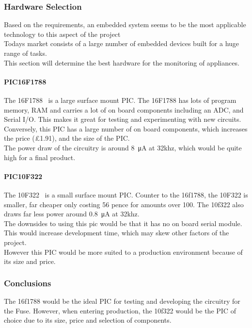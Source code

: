 \documentclass[draft,preprint,12pt,3p]{elsarticle}
\begin{document}
\subsubsection{Hardware Selection}
Based on the requirements, an embedded system seems to be the most applicable technology to this aspect of the project\\
Todays market consists of a large number of embedded devices built for a huge range of tasks.\\
This section will determine the best hardware for the monitoring of appliances.
\paragraph{PIC16F1788}
The 16F1788~\cite{16f1788} is a large surface mount PIC. The 16F1788 has lots of program memory, RAM  and carries a lot of on board components including an ADC, and Serial I/O. This makes it great for testing and experimenting with new circuits.\\
Conversely, this PIC has a large number of on board components, which increases the price (\pounds1.91),  and the size of the PIC.\\
The power draw of the circuitry is around \SI{8}{\micro\ampere} at 32khz, which would be quite high for a final product.



\paragraph{PIC10F322}
The 10F322~\cite{10f322} is a small surface mount PIC. Counter to the 16f1788, the 10F322 is smaller, far cheaper only costing 56 pence for amounts over 100.
The 10f322 also draws far less power around \SI{0.8}{\micro\ampere} at 32khz.\\
The downsides to using this pic would be that it has no on board serial module. This would increase development time, which may skew other factors of the project.\\
However this PIC would be more suited to a production environment because of its size and price.


\subsubsection{Conclusions}
The 16f1788 would be the ideal PIC for testing and developing the circuitry for the Fuse. However, when entering production, the 10f322 would be the PIC of choice due to its size, price and selection of components.
\end{document}
